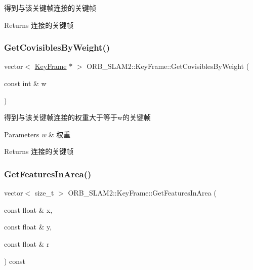 得到与该关键帧连接的关键帧 

\begin{DoxyReturn}{Returns}
连接的关键帧 
\end{DoxyReturn}
\mbox{\label{class_o_r_b___s_l_a_m2_1_1_key_frame_a7047bffbf130b00dd0270df99874f8a1}} 
\subsubsection{\texorpdfstring{Get\+Covisibles\+By\+Weight()}{GetCovisiblesByWeight()}}
{\footnotesize\ttfamily vector$<$ \mbox{\hyperlink{class_o_r_b___s_l_a_m2_1_1_key_frame}{Key\+Frame}} $\ast$ $>$ O\+R\+B\+\_\+\+S\+L\+A\+M2\+::\+Key\+Frame\+::\+Get\+Covisibles\+By\+Weight (\begin{DoxyParamCaption}\item[{const int \&}]{w }\end{DoxyParamCaption})}



得到与该关键帧连接的权重大于等于w的关键帧 


\begin{DoxyParams}{Parameters}
{\em w} & 权重 \\
\hline
\end{DoxyParams}
\begin{DoxyReturn}{Returns}
连接的关键帧 
\end{DoxyReturn}
\mbox{\label{class_o_r_b___s_l_a_m2_1_1_key_frame_aa057f2902cc7910343c5d452d33cb39f}} 
\subsubsection{\texorpdfstring{Get\+Features\+In\+Area()}{GetFeaturesInArea()}}
{\footnotesize\ttfamily vector$<$ size\+\_\+t $>$ O\+R\+B\+\_\+\+S\+L\+A\+M2\+::\+Key\+Frame\+::\+Get\+Features\+In\+Area (\begin{DoxyParamCaption}\item[{const float \&}]{x,  }\item[{const float \&}]{y,  }\item[{const float \&}]{r }\end{DoxyParamCaption}) const}

